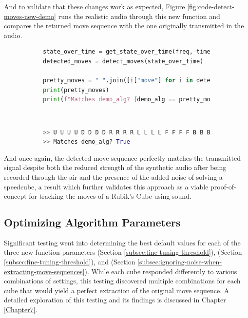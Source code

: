 And to validate that these changes work as expected, Figure
\ref{fig:code-detect-moves-new-demo} runs the realistic audio through
this new  function and compares the returned move
sequence with the one originally transmitted in the audio.

\begin{figure}[h]
\caption{Example: Refined move sequence extraction}
\label{fig:code-detect-moves-new-demo}
\begin{subfigure}{\textwidth}
\begin{lstlisting}[language=Python]
state_over_time = get_state_over_time(freq, time, spectrogram)
detected_moves = detect_moves(state_over_time)

pretty_moves = " ".join([i["move"] for i in detected_moves])
print(pretty_moves)   
print(f"Matches demo_alg? {demo_alg == pretty_moves}")
\end{lstlisting}
\end{subfigure}\\

\begin{subfigure}{\textwidth}
\begin{lstlisting}[language=Python, numbers=none]
>> U U U U D D D D R R R R L L L L F F F F B B B B
>> Matches demo_alg? True
\end{lstlisting}
\end{subfigure}
\end{figure}

And once again, the detected move sequence perfectly matches the
transmitted signal despite both the reduced strength of the synthetic
audio after being recorded through the air and the presence of the
added noise of solving a speedcube, a result which further validates
this approach as a viable proof-of-concept for tracking the moves of a
Rubik's Cube using sound.

\subsection{Optimizing Algorithm Parameters}
\label{subsec:optimizing-params}

Significant testing went into determining the best default values for
each of the three new function parameters  (Section
\ref{subsec:fine-tuning-threshold}),  (Section
\ref{subsec:fine-tuning-threshold}), and  (Section
\ref{subsec:ignoring-noise-when-extracting-move-sequences}). While each
cube responded differently to various combinations of settings, this
testing discovered multiple combinations for each cube that would yield
a perfect extraction of the original move sequence. A detailed
exploration of this testing and its findings is discussed in Chapter
\ref{Chapter7}.


